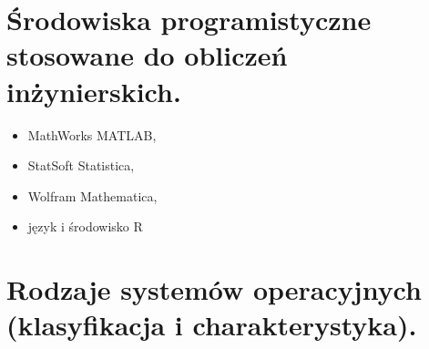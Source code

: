 \documentclass[12pt,a4paper]{article}
\begin{document}
	\section{Środowiska programistyczne stosowane do obliczeń inżynierskich.}
	\begin{itemize}
		\item MathWorks MATLAB,
		\item StatSoft Statistica,
		\item Wolfram Mathematica,
		\item język i środowisko R
	\end{itemize}

	\section{Rodzaje systemów operacyjnych (klasyfikacja i charakterystyka).}
\end{document}
